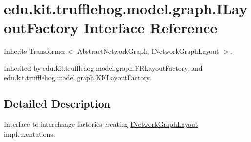 \hypertarget{interfaceedu_1_1kit_1_1trufflehog_1_1model_1_1graph_1_1_i_layout_factory}{}\section{edu.\+kit.\+trufflehog.\+model.\+graph.\+I\+Layout\+Factory Interface Reference}
\label{interfaceedu_1_1kit_1_1trufflehog_1_1model_1_1graph_1_1_i_layout_factory}


Inherits Transformer$<$ Abstract\+Network\+Graph, I\+Network\+Graph\+Layout $>$.



Inherited by \hyperlink{classedu_1_1kit_1_1trufflehog_1_1model_1_1graph_1_1_f_r_layout_factory}{edu.\+kit.\+trufflehog.\+model.\+graph.\+F\+R\+Layout\+Factory}, and \hyperlink{classedu_1_1kit_1_1trufflehog_1_1model_1_1graph_1_1_k_k_layout_factory}{edu.\+kit.\+trufflehog.\+model.\+graph.\+K\+K\+Layout\+Factory}.



\subsection{Detailed Description}
Interface to interchange factories creating \hyperlink{interfaceedu_1_1kit_1_1trufflehog_1_1model_1_1graph_1_1_i_network_graph_layout}{I\+Network\+Graph\+Layout} implementations. 
